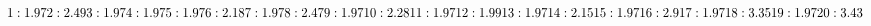 $1: 1.97\\
2: 2.49\\
3: 1.97\\
4: 1.97\\
5: 1.97\\
6: 2.18\\
7: 1.97\\
8: 2.47\\
9: 1.97\\
10: 2.28\\
11: 1.97\\
12: 1.99\\
13: 1.97\\
14: 2.15\\
15: 1.97\\
16: 2.9\\
17: 1.97\\
18: 3.35\\
19: 1.97\\
20: 3.43$